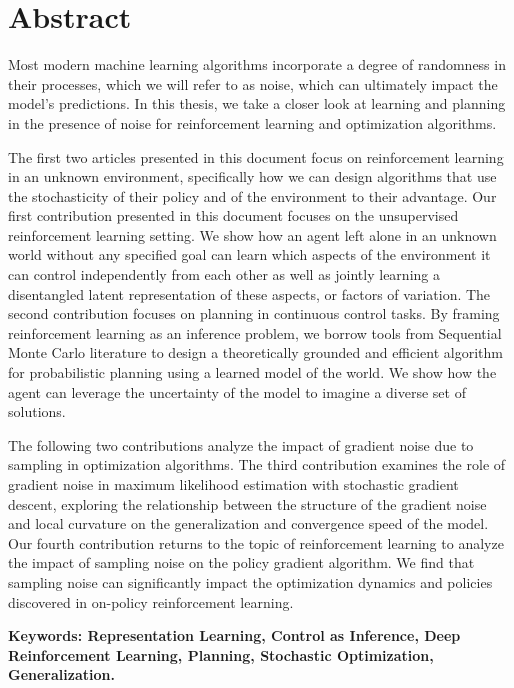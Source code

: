 \chapter*{Abstract}

Most modern machine learning algorithms incorporate a degree of randomness in their processes, which we will refer to as noise, which can ultimately impact the model's predictions. In this thesis, we take a closer look at learning and planning in the presence of noise for reinforcement learning and optimization algorithms.

The first two articles presented in this document focus on reinforcement learning in an unknown environment, specifically how we can design algorithms that use the stochasticity of their policy and of the environment to their advantage.
Our first contribution presented in this document focuses on the unsupervised reinforcement learning setting. We show how an agent left alone in an unknown world without any specified goal can learn which aspects of the environment it can control independently from each other as well as jointly learning a disentangled latent representation of these aspects, or factors of variation.
The second contribution focuses on planning in continuous control tasks. By framing reinforcement learning as an inference problem, we borrow tools from Sequential Monte Carlo literature to design a theoretically grounded and efficient algorithm for probabilistic planning using a learned model of the world. We show how the agent can leverage the uncertainty of the model to imagine a diverse set of solutions.

The following two contributions analyze the impact of gradient noise due to sampling in optimization algorithms. 
The third contribution examines the role of gradient noise in maximum likelihood estimation with stochastic gradient descent, exploring the relationship between the structure of the gradient noise and local curvature on the generalization and convergence speed of the model. 
Our fourth contribution returns to the topic of reinforcement learning to analyze the impact of sampling noise on the policy gradient algorithm. We find that sampling noise can significantly impact the optimization dynamics and policies discovered in on-policy reinforcement learning.

{\bfseries Keywords: Representation Learning,
   Control as Inference, Deep Reinforcement Learning,
   Planning, Stochastic Optimization,
 Generalization.}









